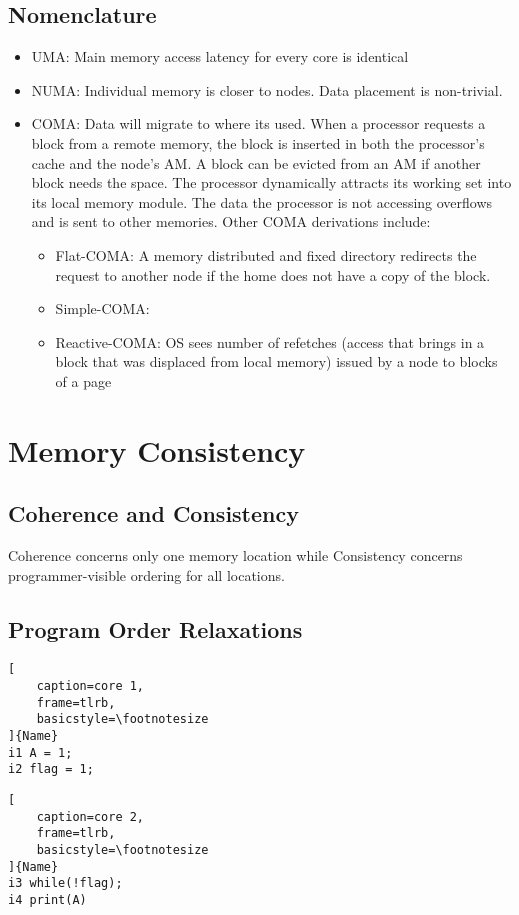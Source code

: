 \documentclass{article}
\begin{document}
\begin{multicols*}{2}
\subsection{Nomenclature}
\begin{itemize}
    \item UMA: Main memory access latency for every core is identical
    \item NUMA: Individual memory is closer to nodes. Data placement is non-trivial.
    \item COMA: Data will migrate to where its used. When a processor requests a block from a remote memory, the block is inserted in both the processor’s cache and the node’s AM. A block can be evicted from an AM if another block needs the space. The processor dynamically attracts its working set into its local memory module. The data the processor is not accessing overflows and is sent to other memories. Other COMA derivations include:
    \begin{itemize}
        \item Flat-COMA: A memory distributed and fixed directory redirects the request to another node if the home does not have a copy of the block.
        \item Simple-COMA:
        \item Reactive-COMA: OS sees number of refetches (access that brings in a block that was displaced from local memory) issued by a node to blocks of a page
    \end{itemize}
\end{itemize}

\section{Memory Consistency}

\subsection{Coherence and Consistency}
Coherence concerns only one memory location while Consistency concerns programmer-visible ordering for all locations.

\subsection{Program Order Relaxations}

\noindent\begin{minipage}{.2\textwidth}
\captionsetup{labelformat=empty}
\begin{lstlisting}[
    caption=core 1,
    frame=tlrb, 
    basicstyle=\footnotesize
]{Name}
i1 A = 1;
i2 flag = 1;
\end{lstlisting}
\end{minipage}\hfill
\begin{minipage}{.2\textwidth}
\captionsetup{labelformat=empty}
\begin{lstlisting}[
    caption=core 2,
    frame=tlrb,
    basicstyle=\footnotesize
]{Name}
i3 while(!flag);
i4 print(A)
\end{lstlisting}
\end{minipage}


\end{multicols*}
\end{document}

